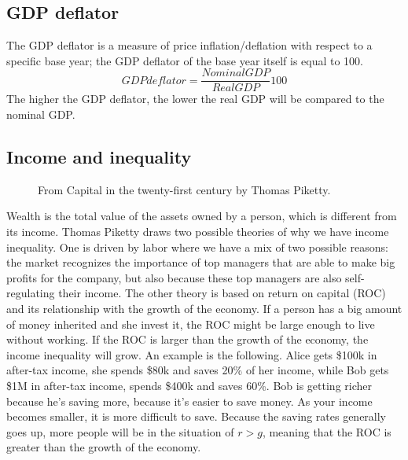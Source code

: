 \subsection{GDP deflator}
The GDP deflator is a measure of price inflation/deflation with respect to a specific base year; the GDP deflator of the base year itself is equal to 100.
\begin{equation}
GDP deflator = \dfrac{Nominal GDP}{Real GDP} 100
\end{equation}
The higher the GDP deflator, the lower the real GDP will be compared to the nominal GDP.

\subsection{Income and inequality}
\begin{figure}
    \caption{From Capital in the twenty-first century by Thomas Piketty.}
    \label{fig:piketty}
\end{figure}

Wealth is the total value of the assets owned by a person, which is different from its income. Thomas Piketty draws two possible theories of why we have income inequality. One is driven by labor where we have a mix of two possible reasons: the market recognizes the importance of top managers that are able to make big profits for the company, but also because these top managers are also self-regulating their income. The other theory is based on return on capital (ROC) and its relationship with the growth of the economy. If a person has a big amount of money inherited and she invest it, the ROC might be large enough to live without working. If the ROC is larger than the growth of the economy, the income inequality will grow. An example is the following. Alice gets \$100k in after-tax income, she spends \$80k and saves 20\% of her income, while Bob gets \$1M in after-tax income, spends \$400k and saves 60\%. Bob is getting richer because he's saving more, because it's easier to save money. As your income becomes smaller, it is more difficult to save. Because the saving rates generally goes up, more people will be in the situation of $r > g$, meaning that the ROC is greater than the growth of the economy. 

